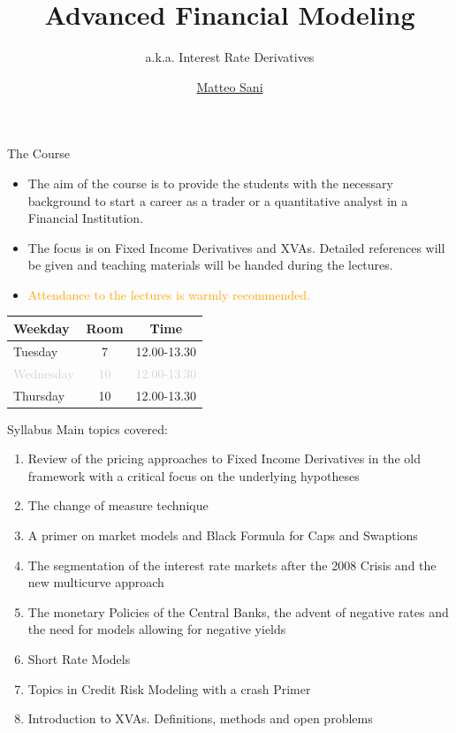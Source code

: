 \documentclass{beamer}
\title{Advanced Financial Modeling}
\subtitle{a.k.a. Interest Rate Derivatives}
\author{\href{mailto:matteo.sani@unisi.it}{Matteo Sani}}
\begin{document}
\begin{frame}[plain]
	\maketitle
\end{frame}

\begin{frame}{The Course}
	\begin{itemize}
	\item The aim of the course is to provide the students with the necessary background to start a career as a trader or a quantitative analyst in a Financial Institution.
	\item The focus is on Fixed Income Derivatives and XVAs. Detailed references will be given and teaching materials will be handed during the lectures.
	\item \textcolor{orange}{Attendance to the lectures is warmly recommended.}
	\end{itemize}
	\begin{table}[bt]
		\begin{tabular}{|l|c|c|} \hline
			\textbf{Weekday} & \textbf{Room} & \textbf{Time} \\ \hline
			Tuesday & 7 & 12.00-13.30 \\ \hline
			\textcolor{lightgray}{Wednesday} & \textcolor{lightgray}{10} & \textcolor{lightgray}{12.00-13.30} \\ \hline
			Thursday & 10 & 12.00-13.30 \\ \hline
		\end{tabular}
	\end{table}
\end{frame}

\begin{frame}{Syllabus}
	Main topics covered:
	\begin{enumerate}	
	\item \textcolor{maincolor}{Review of the pricing approaches to Fixed Income Derivatives in the old framework with a critical focus on the underlying hypotheses}
	\item \textcolor{maincolor}{The change of measure technique}
	\item \textcolor{maincolor}{A primer on market models and Black Formula for Caps and Swaptions}
	\item The segmentation of the interest rate markets after the 2008 Crisis and the new multicurve approach
	\item The monetary Policies of the Central Banks, \textcolor{maincolor}{the advent of negative rates and the need for models allowing for negative yields}
	\item Short Rate Models 
	\item Topics in Credit Risk Modeling with a crash Primer
	\item Introduction to XVAs. Definitions, methods and open problems
	\end{enumerate}
\end{frame}
\end{document}
